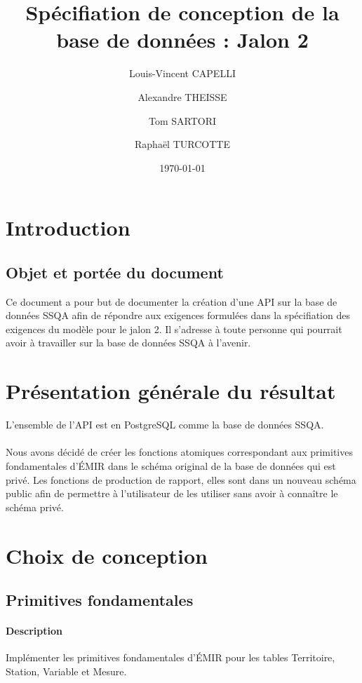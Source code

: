 \documentclass{article}
\begin{document}
\title{Spécifiation de conception de la base de données : Jalon 2}

\author{Louis-Vincent CAPELLI \and Alexandre THEISSE \and Tom SARTORI \and Raphaël TURCOTTE}
\date{\today}
\maketitle
\newpage

\tableofcontents
\newpage

\section{Introduction}
\subsection*{Objet et portée du document}
Ce document a pour but de documenter la création d'une API sur la base de données
SSQA afin de répondre aux exigences formulées dans la
spécifiation des exigences du modèle pour le jalon 2.
Il s'adresse à toute personne qui pourrait avoir à travailler sur la base de données
SSQA à l'avenir.

\section{Présentation générale du résultat}
L'ensemble de l'API est en PostgreSQL comme la base de données SSQA.
\\\\
Nous avons décidé de créer les fonctions atomiques correspondant aux primitives 
fondamentales d'ÉMIR dans le schéma original de la base de données qui est privé.
Les fonctions de production de rapport, elles sont dans un nouveau schéma public
afin de permettre à l'utilisateur de les utiliser sans avoir à connaître le
schéma privé.


\section{Choix de conception}
\subsection{Primitives fondamentales}
\paragraph{Description} Implémenter les primitives fondamentales d'ÉMIR
pour les tables Territoire, Station, Variable et Mesure.
\end{document}
